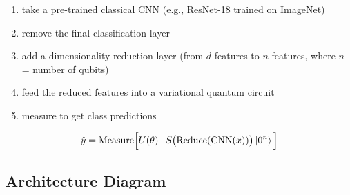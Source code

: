 \documentclass[11pt,a4paper]{article}
\theoremstyle{definition}
\theoremstyle{remark}
\begin{document}
\begin{enumerate}[label=\arabic*.]
    \item take a pre-trained classical CNN (e.g., ResNet-18 trained on ImageNet)
    \item remove the final classification layer
    \item add a dimensionality reduction layer (from $d$ features to $n$ features, where $n$ = number of qubits)
    \item feed the reduced features into a variational quantum circuit
    \item measure to get class predictions
\end{enumerate}

\begin{equation}
    \hat{y} = \text{Measure}\Big[ U(\theta) \cdot S\big(\text{Reduce}(\text{CNN}(x))\big) \ket{0^n} \Big]
\end{equation}

\subsection{Architecture Diagram}
\end{document}
